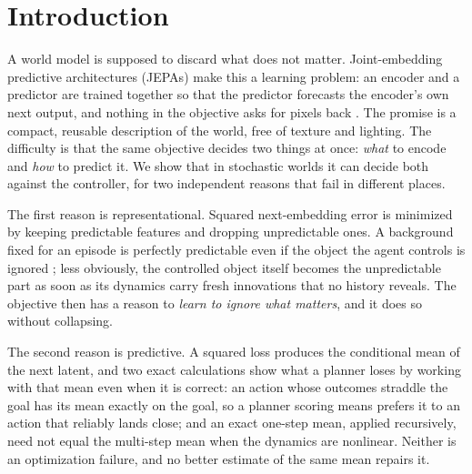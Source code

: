 \section{Introduction}
\label{sec:intro}

A world model is supposed to discard what does not matter. Joint-embedding predictive architectures
(JEPAs) make this a learning problem: an encoder and a predictor are trained together so that the
predictor forecasts the encoder's own next output, and nothing in the objective asks for pixels
back \citep{lecun2022path,assran2023ijepa,bardes2024vjepa,maes2026lewm}. The promise is a compact,
reusable description of the world, free of texture and lighting. The difficulty is that the same
objective decides two things at once: \emph{what} to encode and \emph{how} to predict it. We show
that in stochastic worlds it can decide both against the controller, for two independent reasons
that fail in different places.

The first reason is representational. Squared next-embedding error is minimized by keeping
predictable features and dropping unpredictable ones. A background fixed for an episode is
perfectly predictable even if the object the agent controls is ignored \citep{sobal2022slow}; less
obviously, the controlled object itself becomes the unpredictable part as soon as its dynamics
carry fresh innovations that no history reveals. The objective then has a reason to \emph{learn to
ignore what matters}, and it does so without collapsing.

The second reason is predictive. A squared loss produces the conditional mean of the next latent,
and two exact calculations show what a planner loses by working with that mean even when it is
correct: an action whose outcomes straddle the goal has its mean exactly on the goal, so a planner
scoring means prefers it to an action that reliably lands close; and an exact one-step mean,
applied recursively, need not equal the multi-step mean when the dynamics are nonlinear. Neither
is an optimization failure, and no better estimate of the same mean repairs it.


